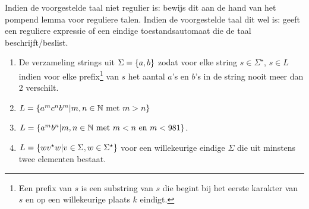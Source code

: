 \documentclass{article}
\begin{document}
\begin{question}
Indien de voorgestelde taal niet regulier is: bewijs dit aan de hand van het pompend lemma voor reguliere talen. Indien
de voorgestelde taal dit wel is: geeft een reguliere expressie of een eindige toestandsautomaat die de taal
beschrijft/beslist.
\begin{enumerate}
 \item De verzameling strings uit $\Sigma=\left\{ a,b \right\}$ zodat voor elke string $s\in\Sigma^\star$, $s\in L$ indien voor
elke prefix\footnote{Een prefix van $s$ is een substring van $s$ die begint bij het eerste karakter van $s$ en op een
willekeurige plaats $k$ eindigt.} van $s$ het aantal $a$'s en $b$'s in de string nooit meer dan 2 verschilt.
 \item $L=\left\{ a^mc^nb^m|m,n\in\mathbb{N}\mbox{ met $m> n$} \right\}$
 \item $L=\left\{ a^mb^n|m,n\in\mathbb{N}\mbox{ met $m<n$ en $m<981$} \right\}$.
 \item $L=\left\{ wv^\star w|v\in\Sigma,w\in\Sigma^\star \right\}$ voor een willekeurige eindige $\Sigma$ die uit
minstens twee elementen bestaat.
\end{enumerate}
\end{question}
\end{document}
